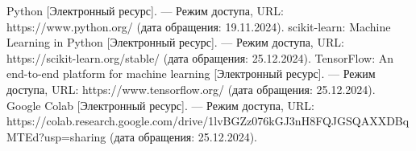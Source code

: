 \begin{thebibliography}{}
	 Python [Электронный ресурс]. — Режим доступа, URL: https://www.python.org/ (дата обращения: 19.11.2024).
	 scikit-learn: Machine Learning in Python [Электронный ресурс]. — Режим доступа, URL: https://scikit-learn.org/stable/ (дата обращения: 25.12.2024).
	 TensorFlow: An end-to-end platform for machine learning [Электронный ресурс]. — Режим доступа, URL: https://www.tensorflow.org/ (дата обращения: 25.12.2024).
	 Google Colab [Электронный ресурс]. — Режим доступа, URL: https://colab.research.google.com/drive/1lvBGZz076kGJ3nH8FQJGSQAXXDBqMTEd?usp=sharing (дата обращения: 25.12.2024).
\end{thebibliography}
